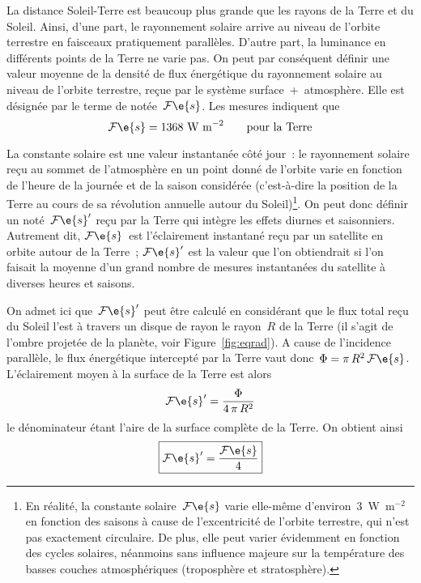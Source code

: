 \sk
La distance Soleil-Terre est beaucoup plus grande que les rayons de la Terre et du Soleil. Ainsi, d'une part, le rayonnement solaire arrive au niveau de l'orbite terrestre en faisceaux pratiquement parallèles. D'autre part, la luminance en différents points de la Terre ne varie pas. On peut par conséquent définir une valeur moyenne de la densité de flux énergétique du rayonnement solaire au niveau de l'orbite terrestre, reçue par le système surface~+~atmosphère. Elle est désignée par le terme de  notée~$\mathcal{F}\e{s}$. Les mesures indiquent que
\[ \mathcal{F}\e{s} = 1368 \text{~W~m}^{-2} \qquad \text{pour la Terre} \]

\sk
La constante solaire est une valeur instantanée côté jour~: le rayonnement solaire reçu au sommet de l'atmosphère en un point donné de l'orbite varie en fonction de l'heure de la journée et de la saison considérée (c'est-à-dire la position de la Terre au cours de sa révolution annuelle autour du Soleil)\footnote{En réalité, la constante solaire~$\mathcal{F}\e{s}$ varie elle-même d'environ~$3$~W~m$^{-2}$ en fonction des saisons à cause de l'excentricité de l'orbite terrestre, qui n'est pas exactement circulaire. De plus, elle peut varier évidemment en fonction des cycles solaires, néanmoins sans influence majeure sur la température des basses couches atmosphériques (troposphère et stratosphère).}. On peut donc définir un  noté~$\mathcal{F}\e{s}'$ reçu par la Terre qui intègre les effets diurnes et saisonniers. Autrement dit, $\mathcal{F}\e{s}$~est l'éclairement instantané reçu par un satellite en orbite autour de la Terre~; $\mathcal{F}\e{s}'$ est la valeur que l'on obtiendrait si l'on faisait la moyenne d'un grand nombre de mesures instantanées du satellite à diverses heures et saisons. 


\sk
On admet ici que~$\mathcal{F}\e{s}'$ peut être calculé en considérant que le flux total reçu du Soleil l'est à travers un disque de rayon le rayon~$R$ de la Terre (il s'agit de l'ombre projetée de la planète, voir Figure~\ref{fig:eqrad}). A cause de l'incidence parallèle, le flux énergétique intercepté par la Terre vaut donc~$\Phi = \pi \, R^2 \, \mathcal{F}\e{s}$. L'éclairement moyen à la surface de la Terre est alors $$\mathcal{F}\e{s}' = \frac{\Phi}{4 \, \pi \, R^2}$$ le dénominateur étant l'aire de la surface complète de la Terre. On obtient ainsi
\[ \boxed{ \mathcal{F}\e{s}' = \frac{\mathcal{F}\e{s}}{4} } \]
